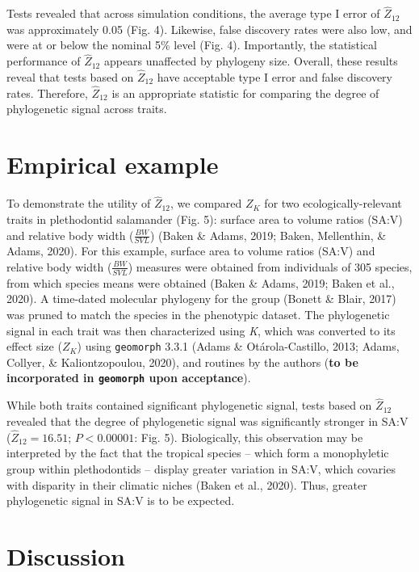 \documentclass[
]{article}
\begin{document}
Tests revealed that across simulation conditions, the average type I
error of \(\hat{Z}_{12}\) was approximately 0.05 (Fig. 4). Likewise,
false discovery rates were also low, and were at or below the nominal
5\% level (Fig. 4). Importantly, the statistical performance of
\(\hat{Z}_{12}\) appears unaffected by phylogeny size. Overall, these
results reveal that tests based on \(\hat{Z}_{12}\) have acceptable type
I error and false discovery rates. Therefore, \(\hat{Z}_{12}\) is an
appropriate statistic for comparing the degree of phylogenetic signal
across traits.

\hypertarget{empirical-example}{%
\section{Empirical example}\label{empirical-example}}

To demonstrate the utility of \(\hat{Z}_{12}\), we compared \(Z_K\) for
two ecologically-relevant traits in plethodontid salamander (Fig. 5):
surface area to volume ratios (SA:V) and relative body width
(\(\frac{BW}{SVL}\)) (Baken \& Adams, 2019; Baken, Mellenthin, \& Adams,
2020). For this example, surface area to volume ratios (SA:V) and
relative body width (\(\frac{BW}{SVL}\)) measures were obtained from
individuals of 305 species, from which species means were obtained
(Baken \& Adams, 2019; Baken et al., 2020). A time-dated molecular
phylogeny for the group (Bonett \& Blair, 2017) was pruned to match the
species in the phenotypic dataset. The phylogenetic signal in each trait
was then characterized using \emph{K}, which was converted to its effect
size (\(Z_K\)) using \texttt{geomorph} 3.3.1 (Adams \& Otárola-Castillo,
2013; Adams, Collyer, \& Kaliontzopoulou, 2020), and routines by the
authors (\textbf{to be incorporated in \texttt{geomorph} upon
acceptance}). \hfill\break

While both traits contained significant phylogenetic signal, tests based
on \(\hat{Z}_{12}\) revealed that the degree of phylogenetic signal was
significantly stronger in SA:V (\(\hat{Z}_{12}=16.51\); \(P< 0.00001\):
Fig. 5). Biologically, this observation may be interpreted by the fact
that the tropical species -- which form a monophyletic group within
plethodontids -- display greater variation in SA:V, which covaries with
disparity in their climatic niches (Baken et al., 2020). Thus, greater
phylogenetic signal in SA:V is to be expected.

\hypertarget{discussion}{%
\section{Discussion}\label{discussion}}
\end{document}

